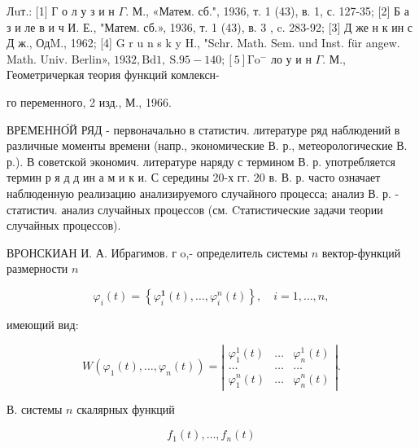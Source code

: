 \documentclass[10pt]{article}
\begin{document}
Лuт.: [1] Г о л у з и н $\Gamma$. М., «Матем. сб.", 1936, т. 1 (43), в. 1, с. 127-35; [2] Б а з и ле в и ч И. Е., "Матем. сб.», 1936, т. 1 (43), в. 3 , c. 283-92; [3] Д же н к ин с Д ж., ОдM., 1962; [4] G r u n s k y H., "Schr. Math. Sem. und Inst. für angew. Math. Univ. Berlin», $1932, \mathrm{Bd} 1, \mathrm{~S} .95-140 ;[5] \mathrm{\Gamma} \mathrm{o}^{-}$ ло у и н $\Gamma$. М., Геометричеркая теория функций комлексн-

го переменного, 2 изд., М., 1966.



ВРЕМЕННО́Й РЯД - первоначально в статистич. литературе ряд наблюдений в различные моменты времени (напр., экономические В. р., метеорологические В. р.). В советской экономич. литературе наряду с термином В. р. употребляется термин р я д д ин а м и к и. С середины 20-х гг. 20 в. В. р. часто означает наблюденную реализацию анализируемого случайного процесса; анализ В. р. - статистич. анализ случайных процессов (см. Cтатистические задачи теории случайных процессов).



ВРОНСКИАН И. А. Ибрагимов. г o,- определитель системы $n$ вектор-функций размерности $n$



\[

\varphi_{i}(t)=\left\{\varphi_{i}^{\mathbf{1}}(t), \ldots, \varphi_{i}^{n}(t)\right\}, \quad i=1, \ldots, n,

\]



имеющий вид:



\[

W\left(\varphi_{1}(t), \ldots, \varphi_{n}(t)\right)=\left|\begin{array}{ccc}

\varphi_{1}^{1}(t) & \ldots & \varphi_{n}^{1}(t) \\

\ldots & \ldots & \ldots \\

\varphi_{1}^{n}(t) & \ldots & \varphi_{n}^{n}(t)

\end{array}\right| .

\]



В. системы $n$ скалярных функций



\[

f_{1}(t), \ldots, f_{n}(t)

\]
\end{document}
